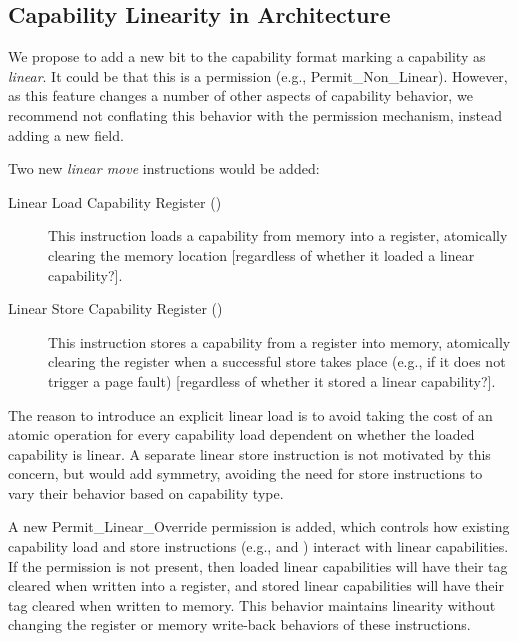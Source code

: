 \subsection{Capability Linearity in Architecture}

We propose to add a new bit to the capability format marking a capability as
\textit{linear}.
%
%
It could be that this is a permission (e.g., Permit\_Non\_Linear).
However, as this
feature changes a number of other aspects of capability behavior, we recommend
not conflating this behavior with the permission mechanism, instead adding a
new field.

Two new \textit{linear move} instructions would be added:

\begin{description}
\item[Linear Load Capability Register ()]
This instruction loads a capability from memory into a register, atomically
clearing the memory location [regardless of whether it loaded a linear
capability?].

\item[Linear Store Capability Register ()]
This instruction stores a capability from a register into memory, atomically
clearing the register when a successful store takes place (e.g., if it does
not trigger a page fault) [regardless of whether it stored a linear
capability?].
\end{description}

The reason to introduce an explicit
linear
load is to avoid taking the cost of an
atomic operation for every capability load dependent on whether the loaded
capability is linear.
%
%
A separate linear store instruction is not motivated by this concern, but
would add
symmetry, avoiding the need for store instructions to vary their behavior
based on capability type.

A new Permit\_Linear\_Override permission is added, which controls how
existing capability load and store instructions (e.g.,  and
) interact with linear capabilities.
If the permission is not present, then loaded linear capabilities will have
their tag cleared when written into a register, and stored linear
capabilities will have their tag cleared when written to memory.
This behavior maintains linearity without changing the register or memory
write-back behaviors of these instructions.

